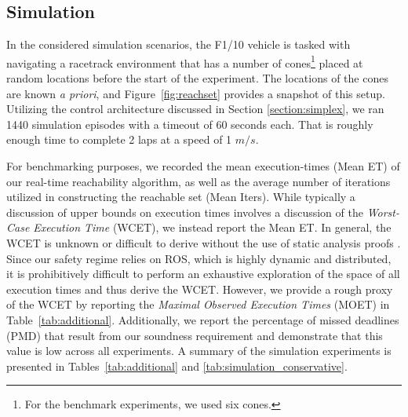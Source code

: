 \documentclass[manuscript,screen,review]{acmart}
\newcommand{\figref}[1]{Figure~\ref{#1}}
\begin{document}
\subsection{Simulation}
In the considered simulation scenarios, the F1/10 vehicle is tasked with navigating a racetrack environment that has a number of cones\footnote{For the benchmark experiments, we used six cones.} placed at random locations before the start of the experiment. The locations of the cones are known \emph{a priori}, and \figref{fig:reachset} provides a snapshot of this setup. Utilizing the control architecture discussed in Section \ref{section:simplex}, we ran 1440 simulation episodes with a timeout of 60 seconds each. That is roughly enough time to complete 2 laps at a speed of 1 $m/s$. %


For benchmarking purposes, we recorded the mean execution-times (Mean ET) of our real-time reachability algorithm, as well as the average number of iterations utilized in constructing the reachable set (Mean Iters). While typically a discussion of upper bounds on execution times involves a discussion of the \emph{Worst-Case Execution Time} (WCET), we instead report the Mean ET. In general, the WCET is unknown or difficult to derive without the use of static analysis proofs \cite{Reinhard2008}. Since our safety regime relies on ROS, which is highly dynamic and distributed, it is prohibitively difficult to perform an exhaustive exploration of the space of all execution times and thus derive the WCET.  However, we provide a rough proxy of the WCET by reporting the \emph{Maximal Observed Execution Times} (MOET) \cite{Reinhard2008} in Table~\ref{tab:additional}. Additionally, we report the percentage of missed deadlines (PMD) that result from our soundness requirement and demonstrate that this value is low across all experiments. %
A summary of the simulation experiments is presented in Tables~\ref{tab:additional} and \ref{tab:simulation_conservative}.
\end{document}
